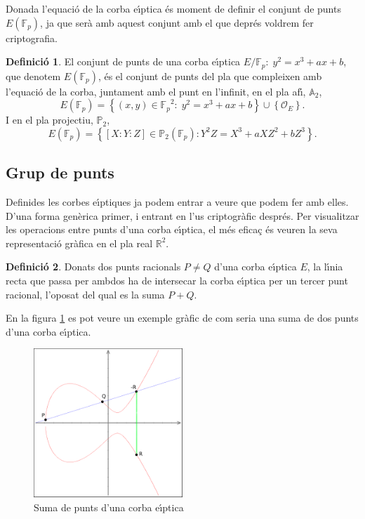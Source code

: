 \documentclass[12pt,twoside,catalan,a4paper]{book}%
\numberwithin{figure}{section}		%
\theoremstyle{definition}   			%
\newtheorem{defi}{Definici\'o}[chapter]%
\def\ce{corba e\lgem{}\'{\i}ptica}%
\def\ces{corbes e\lgem{}\'{\i}ptiques}%
\newcommand{\R}{\ensuremath{\mathbb{R}}}%
\newcommand{\A}{\ensuremath{\mathbb{A}_{2}}}%
\newcommand{\Proy}{\ensuremath{\mathbb{P}_{2}}}%
\newcommand{\Fp}{\ensuremath{\mathbb{F}_p}}%
\newcommand{\EFp}{\ensuremath{E(\mathbb{F}_p)}}%
\theoremstyle{saltolinea}   			%
\begin{document}
Donada l'equaci\'o de la \ce{} \'es moment de definir el conjunt de punts $E(\Fp)$, ja que ser\`a amb aquest conjunt amb el que depr\'es voldrem fer criptografia.
\begin{defi}\label{def:EFp} El conjunt de punts de una \ce{} $E/\Fp:\;y^2=x^3+ax+b$, que denotem \EFp, \'es el conjunt de punts del pla que compleixen amb l'equaci\'o de la corba, juntament amb el punt en l'infinit, en el pla af\'{\i}, \A,
\begin{equation} \EFp=\left\{ (x,y)\in\Fp^2:\;y^{2}=x^{3}+ax+b\right\} \cup\left\{ \mathcal{{O}}_{E}\right\}.\end{equation}
I en el pla projectiu, \Proy,
\begin{equation} \EFp=\left\{[X:Y:Z]\in\Proy(\Fp):Y^{2}Z=X^{3}+aXZ^{2}+bZ^{3}\right\}.\end{equation}
\end{defi}

\subsection{Grup de punts}\label{subsec:addMulPunts}

Definides les \ces{} ja podem entrar a veure que podem fer amb elles. D'una forma gen\`erica primer, i entrant en l'us criptogr\`afic despr\'es. Per visualitzar les operacions entre punts d'una \ce, el m\'es efica\c{c} \'es veuren la seva representaci\'o gr\`afica en el pla real $\R^2$.
\begin{defi}\label{def:sumaEracional} Donats dos punts racionals $P\ne Q$ d'una \ce{} $E$, la l\'{\i}nia recta que passa per ambdos ha de intersecar la \ce{} per un tercer punt racional, l'oposat del qual es la suma $P+Q$.\end{defi}
En la figura \ref{fig:sumaEracional} es pot veure un exemple gr\`afic de com seria una suma de dos punts d'una \ce.

\begin{figure}[ht]
\centering
\includegraphics[width=0.5\textwidth]{plots/curve1_mod.png}
\caption{Suma de punts d'una \ce \label{fig:sumaEracional}}
\end{figure}
\end{document}
